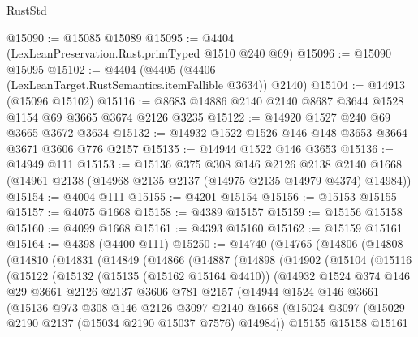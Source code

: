 \begin{lexlean}{RustStd}
\begin{coremodule}
@15090 := @15085 @15089
@15095 := @4404 (LexLeanPreservation.Rust.primTyped @1510 @240 @69)
@15096 := @15090 @15095
@15102 := @4404 (@4405 (@4406 (LexLeanTarget.RustSemantics.itemFallible @3634)) @2140)
@15104 := @14913 (@15096 @15102)
@15116 := @8683 @14886 @2140 @2140 @8687 @3644 @1528 @1154 @69 @3665 @3674 @2126 @3235
@15122 := @14920 @1527 @240 @69 @3665 @3672 @3634
@15132 := @14932 @1522 @1526 @146 @148 @3653 @3664 @3671 @3606 @776 @2157
@15135 := @14944 @1522 @146 @3653
@15136 := @14949 @111
@15153 := @15136
    @375
    @308
    @146
    @2126
    @2138
    @2140
    @1668
    (@14961 @2138 (@14968 @2135 @2137 (@14975 @2135 @14979 @4374) @14984))
@15154 := @4004 @111
@15155 := @4201 @15154
@15156 := @15153 @15155
@15157 := @4075 @1668
@15158 := @4389 @15157
@15159 := @15156 @15158
@15160 := @4099 @1668
@15161 := @4393 @15160
@15162 := @15159 @15161
@15164 := @4398 (@4400 @111)
@15250 := @14740
    (@14765
      (@14806
        (@14808
          (@14810
            (@14831
              (@14849
                (@14866
                  (@14887
                    (@14898
                      (@14902
                        (@15104
                          (@15116
                            (@15122
                              (@15132
                                (@15135 (@15162 @15164 @4410))
                                (@14932
                                  @1524
                                  @374
                                  @146
                                  @29
                                  @3661
                                  @2126
                                  @2137
                                  @3606
                                  @781
                                  @2157
                                  (@14944
                                    @1524
                                    @146
                                    @3661
                                    (@15136
                                      @973
                                      @308
                                      @146
                                      @2126
                                      @3097
                                      @2140
                                      @1668
                                      (@15024
                                        @3097
                                        (@15029 @2190 @2137 (@15034 @2190 @15037 @7576) @14984))
                                      @15155
                                      @15158
                                      @15161

\end{coremodule}
\end{lexlean}
